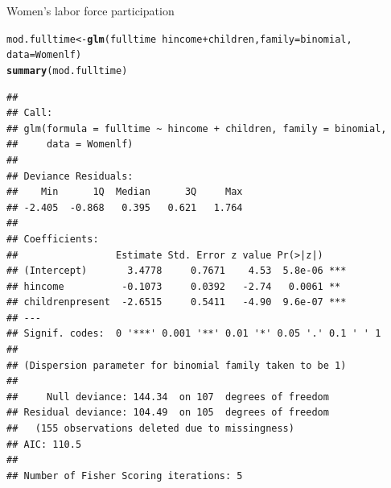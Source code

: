 \documentclass[11pt]{book}\usepackage[]{graphicx}\usepackage[]{color}
\makeatletter
\newcommand{\hlopt}[1]{\textcolor[rgb]{0,0,0}{#1}}%
\newcommand{\hlstd}[1]{\textcolor[rgb]{0.345,0.345,0.345}{#1}}%
\newcommand{\hlkwb}[1]{\textcolor[rgb]{0.69,0.353,0.396}{#1}}%
\newcommand{\hlkwc}[1]{\textcolor[rgb]{0.333,0.667,0.333}{#1}}%
\newcommand{\hlkwd}[1]{\textcolor[rgb]{0.737,0.353,0.396}{\textbf{#1}}}%
\newenvironment{kframe}{%
 \def\at@end@of@kframe{}%
 \ifinner\ifhmode%
  \def\at@end@of@kframe{\end{minipage}}%
  \begin{minipage}{\columnwidth}%
 \fi\fi%
 \def\FrameCommand##1{\hskip\@totalleftmargin \hskip-\fboxsep
 \colorbox{shadecolor}{##1}\hskip-\fboxsep
     \hskip-\linewidth \hskip-\@totalleftmargin \hskip\columnwidth}%
 \MakeFramed {\advance\hsize-\width
   \@totalleftmargin\z@ \linewidth\hsize
   \@setminipage}}%
 {\par\unskip\endMakeFramed%
 \at@end@of@kframe}
\newenvironment{knitrout}{}{} %
\renewenvironment{knitrout}{\small\renewcommand{\baselinestretch}{.85}}{} %
\makeatother
\begin{document}
\begin{Example}[wlfpart1]{Women's labor force participation}
\begin{knitrout}
\begin{kframe}
\begin{alltt}
\hlstd{mod.fulltime} \hlkwb{<-} \hlkwd{glm}\hlstd{(fulltime} \hlopt{~} \hlstd{hincome} \hlopt{+} \hlstd{children,} \hlkwc{family}\hlstd{=binomial,}
                    \hlkwc{data}\hlstd{=Womenlf)}
\hlkwd{summary}\hlstd{(mod.fulltime)}
\end{alltt}
\begin{verbatim}
## 
## Call:
## glm(formula = fulltime ~ hincome + children, family = binomial, 
##     data = Womenlf)
## 
## Deviance Residuals: 
##    Min      1Q  Median      3Q     Max  
## -2.405  -0.868   0.395   0.621   1.764  
## 
## Coefficients:
##                 Estimate Std. Error z value Pr(>|z|)    
## (Intercept)       3.4778     0.7671    4.53  5.8e-06 ***
## hincome          -0.1073     0.0392   -2.74   0.0061 ** 
## childrenpresent  -2.6515     0.5411   -4.90  9.6e-07 ***
## ---
## Signif. codes:  0 '***' 0.001 '**' 0.01 '*' 0.05 '.' 0.1 ' ' 1
## 
## (Dispersion parameter for binomial family taken to be 1)
## 
##     Null deviance: 144.34  on 107  degrees of freedom
## Residual deviance: 104.49  on 105  degrees of freedom
##   (155 observations deleted due to missingness)
## AIC: 110.5
## 
## Number of Fisher Scoring iterations: 5
\end{verbatim}
\end{kframe}
\end{knitrout}


\end{Example}
\end{document}
